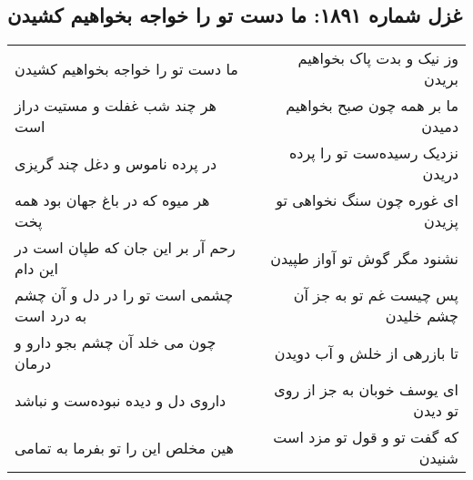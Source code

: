 \begin{center}
\section*{غزل شماره ۱۸۹۱: ما دست تو را خواجه بخواهیم کشیدن}
\label{sec:1891}
\begin{longtable}{l p{0.5cm} r}
ما دست تو را خواجه بخواهیم کشیدن
&&
وز نیک و بدت پاک بخواهیم بریدن
\\
هر چند شب غفلت و مستیت دراز است
&&
ما بر همه چون صبح بخواهیم دمیدن
\\
در پرده ناموس و دغل چند گریزی
&&
نزدیک رسیده‌ست تو را پرده دریدن
\\
هر میوه که در باغ جهان بود همه پخت
&&
ای غوره چون سنگ نخواهی تو پزیدن
\\
رحم آر بر این جان که طپان است در این دام
&&
نشنود مگر گوش تو آواز طپیدن
\\
چشمی است تو را در دل و آن چشم به درد است
&&
پس چیست غم تو به جز آن چشم خلیدن
\\
چون می خلد آن چشم بجو دارو و درمان
&&
تا بازرهی از خلش و آب دویدن
\\
داروی دل و دیده نبوده‌ست و نباشد
&&
ای یوسف خوبان به جز از روی تو دیدن
\\
هین مخلص این را تو بفرما به تمامی
&&
که گفت تو و قول تو مزد است شنیدن
\\
\end{longtable}
\end{center}
